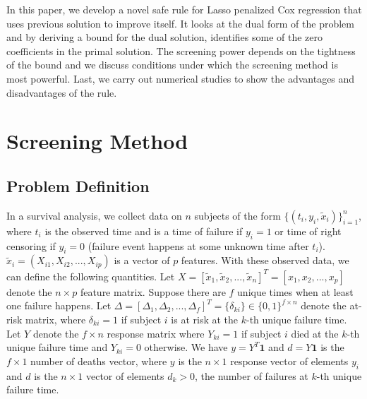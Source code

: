 In this paper, we develop a novel safe rule for Lasso penalized Cox regression that uses previous solution to improve itself. It looks at the dual form of the problem and by deriving a bound for the dual solution, identifies some of the zero coefficients in the primal solution. The screening power depends on the tightness of the bound and we discuss conditions under which the screening method is most powerful. Last, we carry out numerical studies to show the advantages and disadvantages of the rule.

\section{Screening Method}
\subsection{Problem Definition}

In a survival analysis, we collect data on $n$ subjects of the form $\{(t_i,y_i,\tilde{x}_i)\}_{i=1}^n$, where $t_i$ is the observed time and is a time of failure if $y_i=1$ or time of right censoring if $y_i=0$ (failure event happens at some unknown time after $t_i$). $\tilde{x}_i=(X_{i1},X_{i2},...,X_{ip})$ is a vector of $p$ features. With these observed data, we can define the following quantities. Let $X=[\tilde{x}_1,\tilde{x}_2,...,\tilde{x}_n]^T=[x_1,x_2,...,x_p]$ denote the $n\times p$ feature matrix. Suppose there are $f$ unique times when at least one failure happens. Let  $\Delta=[\Delta_1,\Delta_2,...,\Delta_f]^T=\{\delta_{ki}\}\in\{0,1\}^{f\times n}$ denote the at-risk matrix, where $\delta_{ki}=1$ if subject $i$ is at risk at the $k$-th unique failure time. Let $Y$ denote the $f\times n$ response matrix where $Y_{ki}=1$ if subject $i$ died at the $k$-th unique failure time and $Y_{ki}=0$ otherwise. We have $y=Y^T\mathbf{1}$ and $d=Y\mathbf{1}$ is the $f\times 1$ number of deaths vector, where $y$ is the $n\times1$ response vector of elements $y_i$ and $d$ is the $n\times1$ vector of elements $d_k>0$, the number of failures at $k$-th unique failure time.

